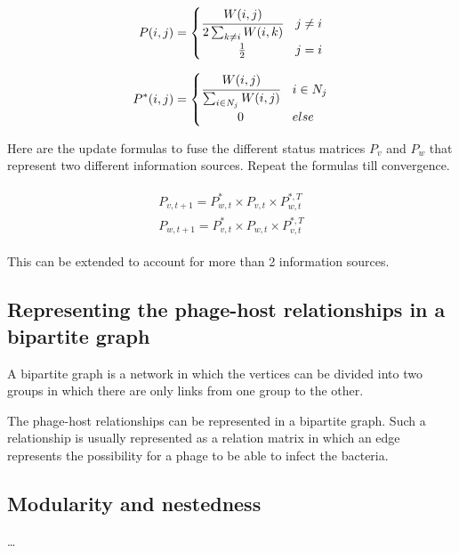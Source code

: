 \documentclass{article}
\begin{document}
\begin{equation}
    P(i, j) = 
    \begin{cases}
        \cfrac{W(i, j)}{2 \sum_{k \neq i}W(i, k)} & j \neq i \\
        \hfil \frac{1}{2} & j = i
    \end{cases}
\end{equation}

\begin{equation}
    P^*(i, j) = 
    \begin{cases}
        \cfrac{W(i, j)}{\sum_{i \in N_j}W(i, j)} & i \in N_j \\
        \hfil 0 & else
    \end{cases}
\end{equation} 

Here are the update formulas to fuse the different status matrices $P_v$ and $P_w$ that 
represent two different information sources. Repeat the formulas till convergence.

\begin{align}
    \begin{split}
        P_{v, t+1} = P^*_{w, t} \times P_{v, t} \times P^{*,T}_{w, t} \\
        P_{w, t+1} = P^*_{v, t} \times P_{w, t} \times P^{*,T}_{v, t}
    \end{split}
\end{align}

This can be extended to account for more than 2 information sources.

\subsection{Representing the phage-host relationships in a bipartite graph}

A bipartite graph is a network in which the vertices can be divided into two 
groups in which there are only links from one group to the other. 

The phage-host relationships can be represented in a bipartite graph. 
Such a relationship is usually represented as a relation matrix in which 
an edge represents the possibility for a phage to be able to infect the 
bacteria.

\subsection{Modularity and nestedness}

\ldots
\end{document}
